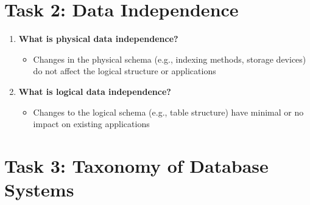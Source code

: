 \documentclass{article}
\begin{document}


\section*{Task 2: Data Independence}
\begin{enumerate}
\item \textbf{What is physical data independence?}
\begin{itemize}
	\item Changes in the physical schema (e.g., indexing methods, storage devices) do not affect the logical structure or applications
\end{itemize}

\item \textbf{What is logical data independence?}
\begin{itemize}
	\item Changes to the logical schema (e.g., table structure) have minimal or no impact on existing applications
\end{itemize}
\end{enumerate}



\newpage
\section*{Task 3: Taxonomy of Database Systems}
\end{document}
